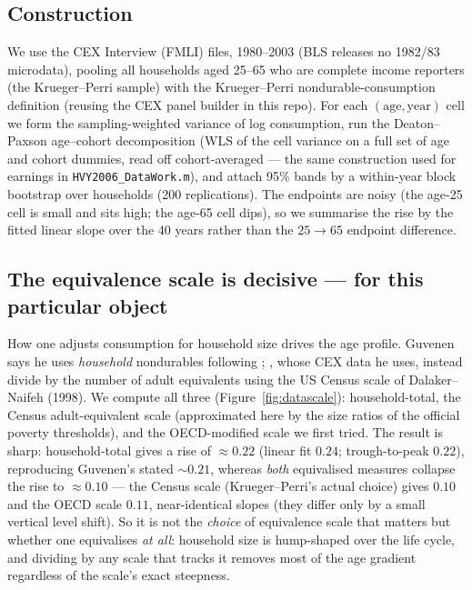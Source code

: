 \documentclass[11pt,fleqn]{article}
\begin{document}
\subsection{Construction}
We use the CEX Interview (FMLI) files, 1980--2003 (BLS releases no 1982/83 microdata),
pooling all households aged 25--65 who are complete income reporters (the Krueger--Perri
sample) with the Krueger--Perri nondurable-consumption definition (reusing the
\cite{Kaplan2012} CEX panel builder in this repo). For each $(\text{age},\text{year})$
cell we form the sampling-weighted variance of log consumption, run the Deaton--Paxson
age--cohort decomposition (WLS of the cell variance on a full set of age and cohort
dummies, read off cohort-averaged --- the same construction used for earnings in
\texttt{HVY2006\_DataWork.m}), and attach 95\% bands by a within-year block bootstrap over
households (200 replications). The endpoints are noisy (the age-25 cell is small and sits
high; the age-65 cell dips), so we summarise the rise by the fitted linear slope over the
40 years rather than the $25\!\to\!65$ endpoint difference.

\subsection{The equivalence scale is decisive --- for this particular object}
How one adjusts consumption for household size drives the age profile. Guvenen says he uses
\emph{household} nondurables following \cite{DeatonPaxson1994}; \cite{KruegerPerri2006},
whose CEX data he uses, instead divide by the number of adult equivalents using the US
Census scale of Dalaker--Naifeh (1998). We compute all three (Figure~\ref{fig:datascale}):
household-total, the Census adult-equivalent scale (approximated here by the size ratios of
the official poverty thresholds), and the OECD-modified scale we first tried. The result is
sharp: household-total gives a rise of $\approx0.22$ (linear fit $0.24$; trough-to-peak
$0.22$), reproducing Guvenen's stated $\sim\!0.21$, whereas \emph{both} equivalised
measures collapse the rise to $\approx0.10$ --- the Census scale (Krueger--Perri's actual
choice) gives $0.10$ and the OECD scale $0.11$, near-identical slopes (they differ only by a
small vertical level shift). So it is not the \emph{choice} of equivalence scale that
matters but whether one equivalises \emph{at all}:
household size is hump-shaped over the life cycle, and dividing by any scale that tracks it
removes most of the age gradient regardless of the scale's exact steepness.
\end{document}
